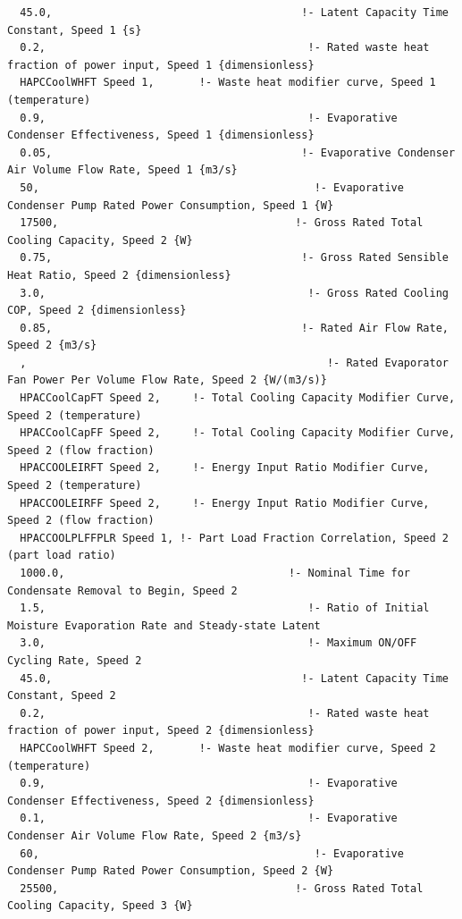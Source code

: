 \begin{lstlisting}
  45.0,                                       !- Latent Capacity Time Constant, Speed 1 {s}
  0.2,                                         !- Rated waste heat fraction of power input, Speed 1 {dimensionless}
  HAPCCoolWHFT Speed 1,       !- Waste heat modifier curve, Speed 1 (temperature)
  0.9,                                         !- Evaporative Condenser Effectiveness, Speed 1 {dimensionless}
  0.05,                                       !- Evaporative Condenser Air Volume Flow Rate, Speed 1 {m3/s}
  50,                                           !- Evaporative Condenser Pump Rated Power Consumption, Speed 1 {W}
  17500,                                     !- Gross Rated Total Cooling Capacity, Speed 2 {W}
  0.75,                                       !- Gross Rated Sensible Heat Ratio, Speed 2 {dimensionless}
  3.0,                                         !- Gross Rated Cooling COP, Speed 2 {dimensionless}
  0.85,                                       !- Rated Air Flow Rate, Speed 2 {m3/s}
  ,                                               !- Rated Evaporator Fan Power Per Volume Flow Rate, Speed 2 {W/(m3/s)}
  HPACCoolCapFT Speed 2,     !- Total Cooling Capacity Modifier Curve, Speed 2 (temperature)
  HPACCoolCapFF Speed 2,     !- Total Cooling Capacity Modifier Curve, Speed 2 (flow fraction)
  HPACCOOLEIRFT Speed 2,     !- Energy Input Ratio Modifier Curve, Speed 2 (temperature)
  HPACCOOLEIRFF Speed 2,     !- Energy Input Ratio Modifier Curve, Speed 2 (flow fraction)
  HPACCOOLPLFFPLR Speed 1, !- Part Load Fraction Correlation, Speed 2 (part load ratio)
  1000.0,                                   !- Nominal Time for Condensate Removal to Begin, Speed 2
  1.5,                                         !- Ratio of Initial Moisture Evaporation Rate and Steady-state Latent
  3.0,                                         !- Maximum ON/OFF Cycling Rate, Speed 2
  45.0,                                       !- Latent Capacity Time Constant, Speed 2
  0.2,                                         !- Rated waste heat fraction of power input, Speed 2 {dimensionless}
  HAPCCoolWHFT Speed 2,       !- Waste heat modifier curve, Speed 2 (temperature)
  0.9,                                         !- Evaporative Condenser Effectiveness, Speed 2 {dimensionless}
  0.1,                                         !- Evaporative Condenser Air Volume Flow Rate, Speed 2 {m3/s}
  60,                                           !- Evaporative Condenser Pump Rated Power Consumption, Speed 2 {W}
  25500,                                     !- Gross Rated Total Cooling Capacity, Speed 3 {W}

\end{lstlisting}
